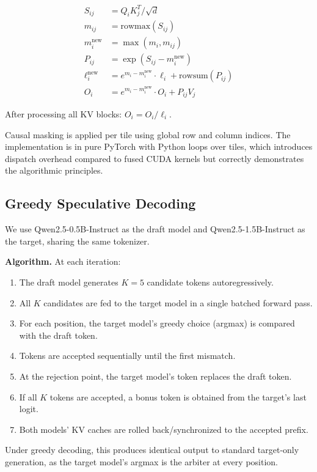 \documentclass[conference]{IEEEtran}
\begin{document}
\begin{align}
S_{ij} &= Q_i K_j^T / \sqrt{d} \\
m_{ij} &= \text{rowmax}(S_{ij}) \\
m_i^{\text{new}} &= \max(m_i, m_{ij}) \\
P_{ij} &= \exp(S_{ij} - m_i^{\text{new}}) \\
\ell_i^{\text{new}} &= e^{m_i - m_i^{\text{new}}} \cdot \ell_i + \text{rowsum}(P_{ij}) \\
O_i &= e^{m_i - m_i^{\text{new}}} \cdot O_i + P_{ij} V_j
\end{align}

After processing all KV blocks: $O_i = O_i / \ell_i$.

Causal masking is applied per tile using global row and column indices. The implementation is in pure PyTorch with Python loops over tiles, which introduces dispatch overhead compared to fused CUDA kernels but correctly demonstrates the algorithmic principles.

\subsection{Greedy Speculative Decoding}

We use Qwen2.5-0.5B-Instruct as the draft model and Qwen2.5-1.5B-Instruct as the target, sharing the same tokenizer.

\textbf{Algorithm.} At each iteration:
\begin{enumerate}
\item The draft model generates $K=5$ candidate tokens autoregressively.
\item All $K$ candidates are fed to the target model in a single batched forward pass.
\item For each position, the target model's greedy choice (argmax) is compared with the draft token.
\item Tokens are accepted sequentially until the first mismatch.
\item At the rejection point, the target model's token replaces the draft token.
\item If all $K$ tokens are accepted, a bonus token is obtained from the target's last logit.
\item Both models' KV caches are rolled back/synchronized to the accepted prefix.
\end{enumerate}

Under greedy decoding, this produces identical output to standard target-only generation, as the target model's argmax is the arbiter at every position.
\end{document}
